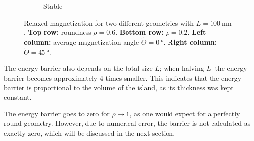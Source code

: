 \documentclass[11pt,a4paper,english]{article}
\begin{document}
\begin{figure}
\begin{subfigure}[b]{0.2\textwidth}
         \caption*{Stable}
         \label{fig:barrier-magnetization-20x100_diag}
     \end{subfigure}
        \caption{Relaxed magnetization for two different geometries with $L=\SI{100}{\nano\metre}$. \textbf{Top row:} roundness $\rho=0.6$. \textbf{Bottom row:} $\rho=0.2$. \textbf{Left column:} average magnetization angle $\widetilde{\Theta} = \SI{0}{\degree}$. \textbf{Right column:} $\widetilde{\Theta} = \SI{45}{\degree}$.}
        \label{fig:barrier-magnetization}
\end{figure}
The energy barrier also depends on the total size $L$; when halving $L$, the energy barrier becomes approximately 4 times smaller. This indicates that the energy barrier is proportional to the volume of the island, as its thickness was kept constant.

The energy barrier goes to zero for $\rho \rightarrow 1$, as one would expect for a perfectly round geometry. However, due to numerical error, the barrier is not calculated as exactly zero, which will be discussed in the next section.
\end{document}

